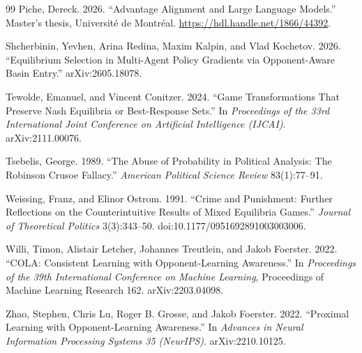 \documentclass[11pt]{article}
\theoremstyle{remark}
\begin{document}
\begin{thebibliography}{99}
 Piche, Dereck. 2026. ``Advantage Alignment and Large Language Models.'' Master's thesis, Universit\'e de Montr\'eal. \url{https://hdl.handle.net/1866/44392}.

 Shcherbinin, Yevhen, Arina Redina, Maxim Kalpin, and Vlad Kochetov. 2026. ``Equilibrium Selection in Multi-Agent Policy Gradients via Opponent-Aware Basin Entry.'' arXiv:2605.18078.

 Tewolde, Emanuel, and Vincent Conitzer. 2024. ``Game Transformations That Preserve Nash Equilibria or Best-Response Sets.'' In \emph{Proceedings of the 33rd International Joint Conference on Artificial Intelligence (IJCAI)}. arXiv:2111.00076.

 Tsebelis, George. 1989. ``The Abuse of Probability in Political Analysis: The Robinson Crusoe Fallacy.'' \emph{American Political Science Review} 83(1):77--91.

 Weissing, Franz, and Elinor Ostrom. 1991. ``Crime and Punishment: Further Reflections on the Counterintuitive Results of Mixed Equilibria Games.'' \emph{Journal of Theoretical Politics} 3(3):343--50. doi:10.1177/0951692891003003006.

 Willi, Timon, Alistair Letcher, Johannes Treutlein, and Jakob Foerster. 2022. ``COLA: Consistent Learning with Opponent-Learning Awareness.'' In \emph{Proceedings of the 39th International Conference on Machine Learning}, Proceedings of Machine Learning Research 162. arXiv:2203.04098.

 Zhao, Stephen, Chris Lu, Roger B. Grosse, and Jakob Foerster. 2022. ``Proximal Learning with Opponent-Learning Awareness.'' In \emph{Advances in Neural Information Processing Systems 35 (NeurIPS)}. arXiv:2210.10125.
\end{thebibliography}
\end{document}
